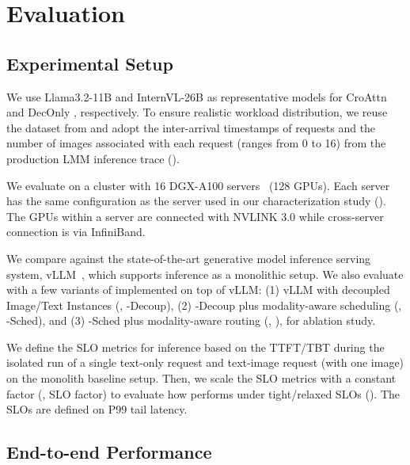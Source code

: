 \section{Evaluation}
\label{sec:eval}

\subsection{Experimental Setup}
\label{sec:eval:setup}

We use Llama3.2-11B and InternVL-26B as representative models for CroAttn and DecOnly \lmms{}, respectively.
To ensure realistic workload distribution, we reuse the \lmm{} dataset from  and adopt the inter-arrival timestamps of requests and the number of images associated with each request (ranges from 0 to 16) from the production LMM inference trace ().

We evaluate \sysname{} on a cluster with 16 DGX-A100 servers~\cite{a100azure} (128 GPUs).
Each server has the same configuration as the server used in our characterization study ().
The GPUs within a server are connected with NVLINK 3.0 while cross-server connection is via InfiniBand.

We compare \sysname{} against the state-of-the-art generative model inference serving system, vLLM~\cite{vllm}, which supports \lmm{} inference as a monolithic setup.
We also evaluate \sysname{} with a few variants of \sysname{} implemented on top of vLLM:
(1) vLLM with decoupled Image/Text Instances (\ie{}, \sysname{}-Decoup),
(2) \sysname{}-Decoup plus modality-aware scheduling (\ie{}, \sysname{}-Sched), and
(3) \sysname{}-Sched plus modality-aware routing (\ie{}, \sysname{}), for ablation study.

We define the SLO metrics for \lmm{} inference based on the TTFT/TBT during the isolated run of a single text-only request and text-image request (with one image) on the monolith baseline setup.
Then, we scale the SLO metrics with a constant factor (\ie{}, SLO factor) to evaluate how \sysname{} performs under tight/relaxed SLOs ().
The SLOs are defined on P99 tail latency.

\subsection{End-to-end Performance}
\label{sec:eval:e2e}

